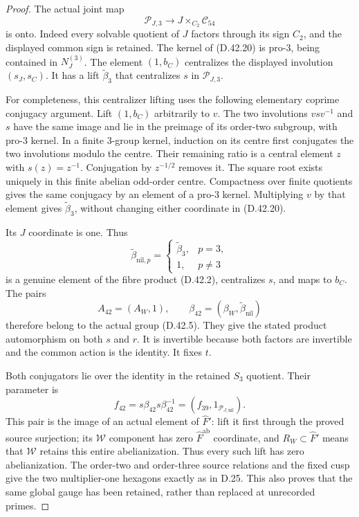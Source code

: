 \begin{proof}
The actual joint map
\[
 \mathcal P_{J,3}\longrightarrow
        J\times_{C_2}\mathcal C_{54}                  \tag{D.42.20}
\]
is onto. Indeed every solvable quotient
of $J$ factors through its sign $C_2$,
and the displayed common sign is
retained. The kernel of (D.42.20) is
pro-$3$, being contained in
$N_J^{(3)}$. The element $(1,b_C)$
centralizes the displayed involution
$(s_J,s_C)$. It has a lift
$\widetilde\beta_3$ that centralizes
$s$ in $\mathcal P_{J,3}$.

For completeness, this centralizer lifting
uses the following elementary coprime
conjugacy argument. Lift $(1,b_C)$
arbitrarily to $v$. The two involutions
$vsv^{-1}$ and $s$ have the same image
and lie in the preimage of its order-two
subgroup, with pro-$3$ kernel. In a
finite $3$-group kernel, induction on
its centre first conjugates the two
involutions modulo the centre. Their
remaining ratio is a central element
$z$ with $s(z)=z^{-1}$. Conjugation
by $z^{-1/2}$ removes it. The square
root exists uniquely in this finite
abelian odd-order centre. Compactness
over finite quotients gives the same
conjugacy by an element of a pro-$3$
kernel. Multiplying $v$ by that
element gives $\widetilde\beta_3$,
without changing either coordinate
in (D.42.20).

Its $J$ coordinate is one. Thus
\[
 \widetilde\beta_{\mathrm{nil},p}
     =\begin{cases}\widetilde\beta_3,&p=3,\\1,&p\ne3
       \end{cases}                                    \tag{D.42.21}
\]
is a genuine element of the fibre
product (D.42.2), centralizes $s$,
and maps to $b_C$. The pairs
\[
 A_{42}=(A_W,1),\qquad
 \beta_{42}=(\beta_W,\widetilde\beta_{\mathrm{nil}})
                                                               \tag{D.42.22}
\]
therefore belong to the actual group
(D.42.5). They give the stated product
automorphism on both $s$ and $r$.
It is invertible because both factors
are invertible and the common action
is the identity. It fixes $t$.

Both conjugators lie over the identity
in the retained $S_3$ quotient. Their
parameter is
\[
 f_{42}=s\beta_{42}s\beta_{42}^{-1}
        =(f_{39},1_{\mathcal P_{J,\mathrm{nil}}}).
                                                               \tag{D.42.23}
\]
This pair is the image of an actual
element of $\widehat F'$: lift it
first through the proved source
surjection; its $\mathcal W$ component
has zero $\widehat F^{\mathrm{ab}}$
coordinate, and $R_W\subset\widehat F'$
means that $\mathcal W$ retains this
entire abelianization. Thus every
such lift has zero abelianization.
The order-two and order-three source
relations and the fixed cusp give
the two multiplier-one hexagons
exactly as in D.25. This also proves
that the same global gauge has been
retained, rather than replaced at
unrecorded primes.


\end{proof}
